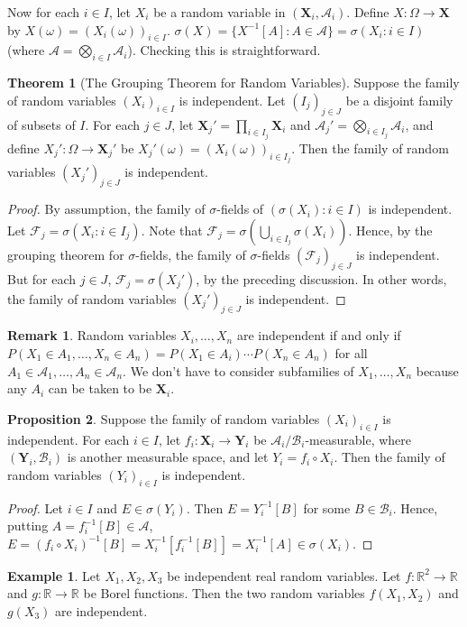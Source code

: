 \documentclass{article}
\newcommand{\R}{\mathbb{R}}
\newcommand{\F}{\mathscr{F}}
\theoremstyle{definition}
\newtheorem{theorem}{Theorem}
\newtheorem{proposition}[theorem]{Proposition}
\newtheorem*{example}{Example}
\newtheorem*{remark}{Remark}
\begin{document}
Now for each $i \in I$, let $X_i$ be a random variable in $(\mathbf{X}_i, \mathscr{A}_i)$. Define $X : \Omega \longrightarrow \mathbf{X}$ by $X(\omega) = (X_i(\omega))_{i \in I}$. $\sigma(X) = \{ X^{-1}[A] : A \in \mathscr{A}\} = \sigma(X_i : i \in I)$ (where $\mathscr{A} = \bigotimes_{i \in I} \mathscr{A}_i$). Checking this is straightforward.

\begin{theorem}[The Grouping Theorem for Random Variables]
    Suppose the family of random variables $(X_i)_{i \in I}$ is independent. Let $(I_j)_{j \in J}$ be a disjoint family of subsets of $I$. For each $j \in J$, let $\mathbf{X}_j' = \prod_{i \in I_j} \mathbf{X}_i$ and $\mathscr{A}_j' = \bigotimes_{i \in I_j} \mathscr{A}_i$, and define $X_j' : \Omega \longrightarrow \mathbf{X}_j'$ be $X_j'(\omega) = (X_i(\omega))_{i \in I_j}$. Then the family of random variables $(X_j')_{j \in J}$ is independent.
\end{theorem}
\begin{proof}
    By assumption, the family of $\sigma$-fields of $(\sigma(X_i) : i \in I)$ is independent. Let $\F_j = \sigma(X_i : i \in I_j)$. Note that $\F_j = \sigma\left(\bigcup_{i \in I_j} \sigma(X_i)\right)$. Hence, by the grouping theorem for $\sigma$-fields, the family of $\sigma$-fields $(\F_j)_{j \in J}$ is independent. But for each $j \in J$, $\F_j = \sigma(X_j')$, by the preceding discussion. In other words, the family of random variables $(X_j')_{j \in J}$ is independent.
\end{proof}
\begin{remark}
Random variables $X_i, \dots, X_n$ are independent if and only if $P(X_1 \in A_1, \dots, X_n \in A_n) = P(X_1 \in A_i)\cdots P(X_n \in A_n)$ for all $A_1 \in \mathscr{A}_1, \dots, A_n \in \mathscr{A}_n$. We don't have to consider subfamilies of $X_1, \dots, X_n$ because any $A_i$ can be taken to be $\mathbf{X}_i$.
\end{remark}
\begin{proposition}
Suppose the family of random variables $(X_i)_{i \in I}$ is independent. For each $i \in I$, let $f_i : \mathbf{X}_i \longrightarrow \mathbf{Y}_i$ be $\mathscr{A}_i/\mathscr{B}_i$-measurable, where $(\mathbf{Y}_i, \mathscr{B}_i)$ is another measurable space, and let $Y_i = f_i \circ X_i$. Then the family of random variables $(Y_i)_{i \in I}$ is independent.
\end{proposition}
\begin{proof}
    Let $i \in I$ and $E \in \sigma(Y_i)$. Then $E = Y_i^{-1}[B]$ for some $B \in \mathscr{B}_i$. Hence, putting $A = f_i^{-1}[B] \in \mathscr{A}$, $E = (f_i \circ X_i)^{-1}[B] = X_i^{-1}[f_i^{-1}[B]] = X_i^{-1}[A] \in \sigma(X_i)$.
\end{proof}
\begin{example}
Let $X_1, X_2, X_3$ be independent real random variables. Let $f : \R^2 \longrightarrow \R$ and $g : \R \longrightarrow \R$ be Borel functions. Then the two random variables $f(X_1,X_2)$ and $g(X_3)$ are independent.
\end{example}
\end{document}

